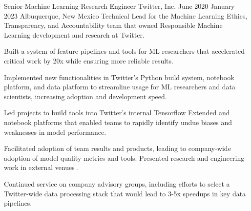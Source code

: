 \documentclass[print]{ag-cv} %
\begin{document}
\begin{job}
  {Senior Machine Learning Research Engineer}
  {Twitter, Inc.}
  {June 2020}
  {January 2023}
  {Albuquerque, New Mexico}
  {
    Technical Lead for the Machine Learning Ethics, Transparency, and Accountability team that owned
    Responsible Machine Learning development and research at Twitter.
  }
  {
    \begin{myitemize}
      \item Built a system of feature pipelines and tools for ML researchers that
      accelerated critical work by 20x while ensuring more reliable results.
      
      \item Implemented new functionalities in Twitter's Python build system,
      notebook platform, and data platform to streamline usage for ML
      researchers and data scientists, increasing adoption and development speed.
      
      \item Led projects to build tools into Twitter's internal Tensorflow
      Extended and notebook platforms that enabled teams to rapidly identify undue biases and
      weaknesses in model performance.
      
      \item Facilitated adoption of team results and products, leading to
      company-wide adoption of model quality metrics and tools. Presented research and engineering work
      in external venues
      \autocite{twitter_htl_racial_bias,twitter_recsys_distributional_inequality,facct_2022_talk,datascience_2022_talk,privacy_enchancing_tech_post}.
      
      \item Continued service on company advisory groups, including efforts to
      select a Twitter-wide data processing stack that would lead to 3-5x
      speedups in key data pipelines.
    \end{myitemize}
  }
\end{job}
\end{document}
